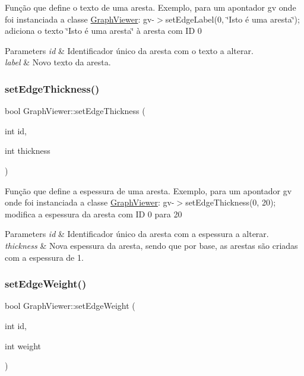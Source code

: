 Função que define o texto de uma aresta. Exemplo, para um apontador gv onde foi instanciada a classe \mbox{\hyperlink{class_graph_viewer}{Graph\+Viewer}}\+: gv-\/$>$set\+Edge\+Label(0, \char`\"{}\+Isto é uma aresta\char`\"{}); adiciona o texto \char`\"{}\+Isto é uma aresta\char`\"{} à aresta com ID 0


\begin{DoxyParams}{Parameters}
{\em id} & Identificador único da aresta com o texto a alterar. \\
\hline
{\em label} & Novo texto da aresta. \\
\hline
\end{DoxyParams}
\mbox{\label{class_graph_viewer_a07f598272fe3515455eab13be749604a}} 
\subsubsection{\texorpdfstring{setEdgeThickness()}{setEdgeThickness()}}
{\footnotesize\ttfamily bool Graph\+Viewer\+::set\+Edge\+Thickness (\begin{DoxyParamCaption}\item[{int}]{id,  }\item[{int}]{thickness }\end{DoxyParamCaption})}

Função que define a espessura de uma aresta. Exemplo, para um apontador gv onde foi instanciada a classe \mbox{\hyperlink{class_graph_viewer}{Graph\+Viewer}}\+: gv-\/$>$set\+Edge\+Thickness(0, 20); modifica a espessura da aresta com ID 0 para 20


\begin{DoxyParams}{Parameters}
{\em id} & Identificador único da aresta com a espessura a alterar. \\
\hline
{\em thickness} & Nova espessura da aresta, sendo que por base, as arestas são criadas com a espessura de 1. \\
\hline
\end{DoxyParams}
\mbox{\label{class_graph_viewer_ac211de009a0afe2e6d44f4f8d030a2cc}} 
\subsubsection{\texorpdfstring{setEdgeWeight()}{setEdgeWeight()}}
{\footnotesize\ttfamily bool Graph\+Viewer\+::set\+Edge\+Weight (\begin{DoxyParamCaption}\item[{int}]{id,  }\item[{int}]{weight }\end{DoxyParamCaption})}

